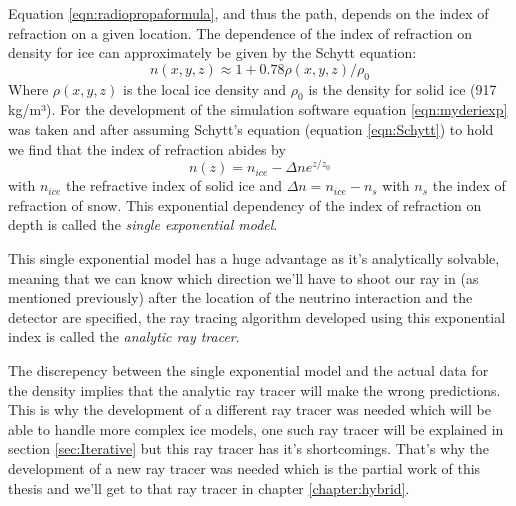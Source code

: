 \documentclass[11pt,a4paper,faculty=we,language=en,doctype=report]{cls/ugent-doc}
\begin{document}
Equation \ref{eqn:radiopropaformula}, and thus the path, depends on the index
of refraction on a given location.  The dependence of the index of refraction
on density for ice can approximately be given by the Schytt equation\cite{Barwick_2018}:
\begin{equation} 
	n(x,y,z) \approx 1 + 0.78\rho(x,y,z)/\rho_0 \label{eqn:Schytt}
\end{equation} 
Where $\rho(x,y,z)$ is the local ice density and $\rho_0$ is the
density for solid ice (917 kg/m³).  For the development of the simulation
software equation \ref{eqn:myderiexp} was taken and after assuming Schytt's
equation (equation \ref{eqn:Schytt}) to hold we find that the index of refraction abides by
\begin{equation}
	\label{eqn:expn}
	n(z) = n_{ice} - \Delta n e^{z/z_0}
\end{equation}
with $n_{ice}$ the refractive index of solid ice and $\Delta n = n_{ice} - n_s$
with $n_s$ the index of refraction of snow. This exponential dependency of the
index of refraction on depth is called the \textit{single exponential model}.  

This single exponential model has a huge advantage as it's analytically
solvable, meaning that we can know which direction we'll have to shoot our ray
in (as mentioned previously) after the location of the neutrino interaction and
the detector are specified, the ray tracing algorithm developed using this
exponential index is called the \textit{analytic ray tracer}.

The discrepency between the single exponential model and the actual data for
the density implies that the analytic ray tracer will make the wrong
predictions.  This is why the development of a different ray tracer was needed
which will be able to handle more complex ice models, one such ray tracer will
be explained in section \ref{sec:Iterative} but this ray tracer has it's
shortcomings. That's why the development of a new ray tracer was needed which
is the partial work of this thesis and we'll get to that ray tracer in chapter
\ref{chapter:hybrid}.
\end{document}
